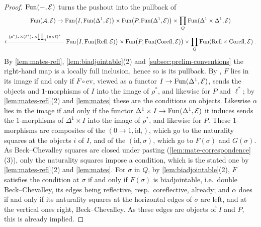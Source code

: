 \begin{proof}
%
$\operatorname{Fun}(-,\mathcal{E})$ turns the pushout into the pullback of
\begin{equation*}
\begin{gathered}
\operatorname{Fun}(\mathcal{A},\mathcal{E}) \to \operatorname{Fun}\bigl(I,\operatorname{Fun}(\Delta^{1},\mathcal{E})\bigr) \times
\operatorname{Fun}\bigl(P,\operatorname{Fun}(\Delta^{1},\mathcal{E})\bigr) \times \prod_{Q}\operatorname{Fun}(\Delta^{1} \times
\Delta^{1},\mathcal{E}) \\
\xleftarrow{\ (\rho^{*})_{*} \times (\ell^{*})_{*} \times \prod_{Q}(\rho \times
\ell)^{*}\ } \operatorname{Fun}\bigl(I,\operatorname{Fun}(\mathrm{Refl},\mathcal{E})\bigr) \times
\operatorname{Fun}\bigl(P,\operatorname{Fun}(\mathrm{Corefl},\mathcal{E})\bigr) \times \prod_{Q}\operatorname{Fun}(\mathrm{Refl} \times
\mathrm{Corefl},\mathcal{E}) \ .
\end{gathered}
\end{equation*}
By \cref{lem:mates-refl}, \cref{lem:biadjointable}(2) and
\cref{subsec:prelim-conventions} the right-hand map is a locally full
inclusion, hence so is its pullback.
By \cite[Cor.~2.6.6]{abellangagnahaugseng2024straightening},
$F$ lies in its image if and only if $F \circ \mathrm{ev}$, viewed as a functor
$I \to \operatorname{Fun}(\Delta^{1},\mathcal{E})$,
sends the objects and $1$-morphisms of $I$ into the image of $\rho^{*}$,
and likewise for $P$ and $\ell^{*}$; by \cref{lem:mates-refl}(2) and
\cref{lem:mates} these are the conditions on objects.
Likewise $\alpha$ lies in the image if and only if the functor
$\Delta^{1} \times I \to \operatorname{Fun}(\Delta^{1},\mathcal{E})$
it induces sends the $1$-morphisms of $\Delta^{1} \times I$ into the image of
$\rho^{*}$, and likewise for $P$. These $1$-morphisms are composites of the
$(0 \to 1,\mathrm{id}_{i})$,
which go to the naturality squares at the objects $i$ of $I$,
and of the $(\mathrm{id},\sigma)$, which go to $F(\sigma)$ and $G(\sigma)$.
As Beck--Chevalley squares are closed under pasting
(\cref{lem:mate-correspondence}(3)), only the naturality squares impose a
condition, which is the stated one by \cref{lem:mates-refl}(2) and
\cref{lem:mates}.
For $\sigma$ in $Q$, by \cref{lem:biadjointable}(2),
$F$ satisfies the condition at $\sigma$ if and only if $F(\sigma)$ is
biadjointable, i.e.\ double Beck--Chevalley,
its edges being reflective, resp.\ coreflective, already;
and $\alpha$ does if and only if its naturality squares at the horizontal edges
of $\sigma$ are left, and at the vertical ones right, Beck--Chevalley.
As these edges are objects of $I$ and $P$, this is already implied.
\end{proof}

